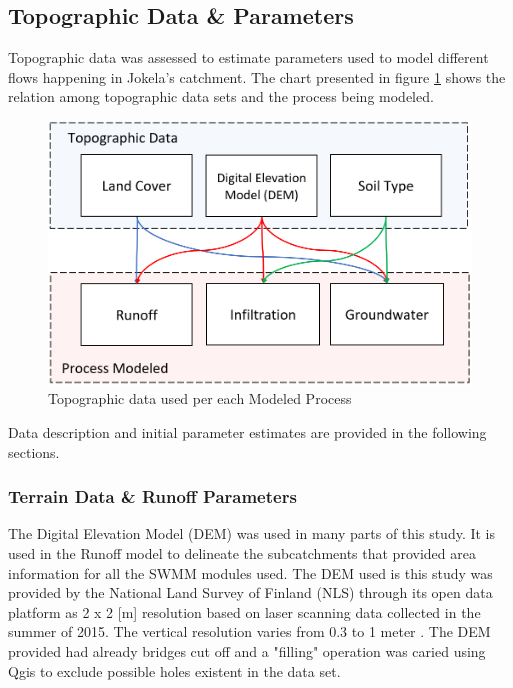         

\subsection{Topographic Data \& Parameters}

Topographic data was assessed to estimate parameters used to model different flows happening in Jokela's catchment. The chart presented in figure \ref{fig:topoxprocess} shows the relation among topographic data sets and the process being modeled. 

\begin{figure}[h]
    \centering
	\includegraphics[scale=0.5]{figures/topo_x_process.png}
	\caption{Topographic data used per each Modeled Process}
	\label{fig:topoxprocess}
\end{figure}

Data description and initial parameter estimates are provided in the following sections. 

\subsubsection{Terrain Data \& Runoff Parameters} \label{runoffcs}
    
The Digital Elevation Model (DEM) was used in many parts of this study. It is used in the Runoff model to delineate the subcatchments that provided area information for all the SWMM modules used. The DEM used is this study was provided by the National Land Survey of Finland (NLS) through its open data platform as 2 x 2 [m] resolution based on laser scanning data collected in the summer of 2015. The vertical resolution varies from 0.3 to 1 meter \cite{nsldata}. The DEM provided had already bridges cut off and a "filling" operation was caried using Qgis to exclude possible holes existent in the data set.

